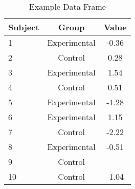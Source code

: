 \begin{table}[h]
\centering
\begin{tabular}{@{}lcc@{}}
\toprule
Subject & Group & Value \\ \midrule
1 & Experimental & -0.36 \\
2 & Control & 0.28 \\
3 & Experimental & 1.54 \\
4 & Control & 0.51 \\
5 & Experimental & -1.28 \\
6 & Experimental & 1.15 \\
7 & Control & -2.22 \\
8 & Experimental & -0.51 \\
9 & Control &   \\
10 & Control & -1.04 \\ \bottomrule
\end{tabular}
\caption{Example Data Frame}
\label{table:dfExample}
\end{table}